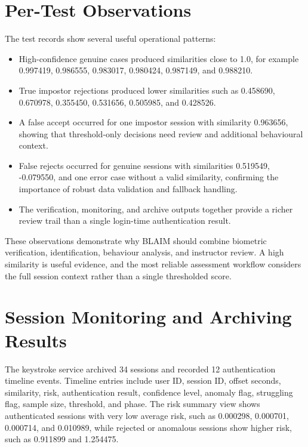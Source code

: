 \section{Per-Test Observations}
\label{sec:per-test-observations}

The test records show several useful operational patterns:

\begin{itemize}
  \item High-confidence genuine cases produced similarities close to 1.0, for example 0.997419, 0.986555, 0.983017, 0.980424, 0.987149, and 0.988210.
  \item True impostor rejections produced lower similarities such as 0.458690, 0.670978, 0.355450, 0.531656, 0.505985, and 0.428526.
  \item A false accept occurred for one impostor session with similarity 0.963656, showing that threshold-only decisions need review and additional behavioural context.
  \item False rejects occurred for genuine sessions with similarities 0.519549, -0.079550, and one error case without a valid similarity, confirming the importance of robust data validation and fallback handling.
  \item The verification, monitoring, and archive outputs together provide a richer review trail than a single login-time authentication result.
\end{itemize}

These observations demonstrate why BLAIM should combine biometric verification, identification, behaviour analysis, and instructor review. A high similarity is useful evidence, and the most reliable assessment workflow considers the full session context rather than a single thresholded score.

\section{Session Monitoring and Archiving Results}
\label{sec:monitoring-archive-results}

The keystroke service archived 34 sessions and recorded 12 authentication timeline events. Timeline entries include user ID, session ID, offset seconds, similarity, risk, authentication result, confidence level, anomaly flag, struggling flag, sample size, threshold, and phase. The risk summary view shows authenticated sessions with very low average risk, such as 0.000298, 0.000701, 0.000714, and 0.010989, while rejected or anomalous sessions show higher risk, such as 0.911899 and 1.254475.

